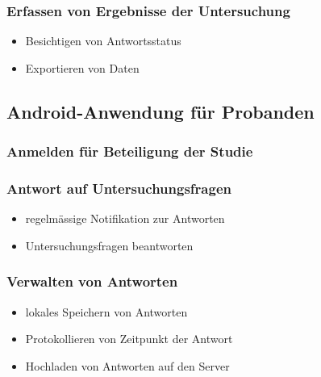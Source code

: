 \documentclass[a4paper]{scrreprt}
\begin{document}
                \subsubsection{Erfassen von Ergebnisse der Untersuchung}
                    \begin{itemize}
                        \item Besichtigen von Antwortsstatus
                        \item Exportieren von Daten
                    \end{itemize}
            \vspace*{2cm}

            \subsection{Android-Anwendung f\"ur Probanden}
                \vspace*{0.2cm}

                \subsubsection{Anmelden f\"ur Beteiligung der Studie}

                \subsubsection{Antwort auf Untersuchungsfragen}
                    \begin{itemize}
                        \item regelm\"assige Notifikation zur Antworten
                        \item Untersuchungsfragen beantworten
                    \end{itemize}

                \subsubsection{Verwalten von Antworten}
                    \begin{itemize}
                        \item lokales Speichern von Antworten
                        \item Protokollieren von Zeitpunkt der Antwort
                        \item Hochladen von Antworten auf den Server
                    \end{itemize}
\end{document}
